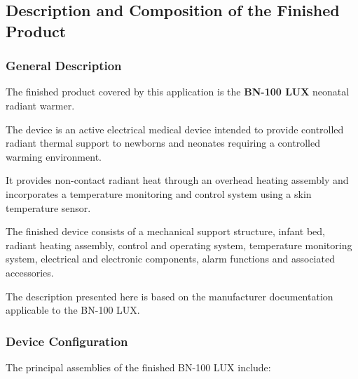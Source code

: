 ﻿

\hypertarget{p3-3-1}{}

\subsection{Description and Composition of the Finished Product}

\subsubsection{General Description}

The finished product covered by this application is the
\textbf{BN-100 LUX} neonatal radiant warmer.

The device is an active electrical medical device intended to provide
controlled radiant thermal support to newborns and neonates requiring
a controlled warming environment.

It provides non-contact radiant heat through an overhead heating
assembly and incorporates a temperature monitoring and control system
using a skin temperature sensor.

The finished device consists of a mechanical support structure,
infant bed, radiant heating assembly, control and operating system,
temperature monitoring system, electrical and electronic components,
alarm functions and associated accessories.

The description presented here is based on the manufacturer
documentation applicable to the BN-100 LUX.


\subsubsection{Device Configuration}

The principal assemblies of the finished BN-100 LUX include:

